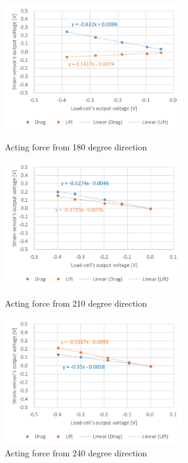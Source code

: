 \documentclass[twocolumn,a4j]{jsarticle}
\begin{document}
\begin{figure}[htbp]
    \footnotesize
    \begin{center}
        \includegraphics[width=78mm]{../images/180.png}
        \caption{Acting force from 180 degree direction}
        \includegraphics[width=78mm]{../images/210.png}
        \caption{Acting force from 210 degree direction}
        \includegraphics[width=78mm]{../images/240.png}
        \caption{Acting force from 240 degree direction}
    \end{center}
\end{figure}
\end{document}
